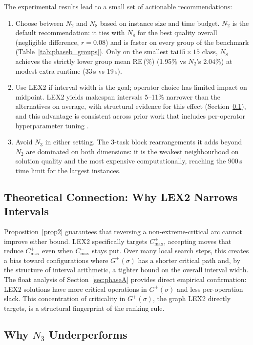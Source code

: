 \documentclass[preprint,12pt]{elsarticle}
\begin{document}
The experimental results lead to a small set of actionable recommendations:
\begin{enumerate}
\item Choose between $N_2$ and $N_8$ based on instance size and time budget. $N_2$ is the default recommendation: it ties with $N_8$ for the best quality overall (negligible difference, $r = 0.08$) and is faster on every group of the benchmark (Table~\ref{tab:phaseb_groups}). Only on the smallest tai$15{\times}15$ class, $N_8$ achieves the strictly lower group mean RE\,(\%) (1.95\% vs $N_2$'s 2.04\%) at modest extra runtime (33\,s vs 19\,s).
\item Use LEX2 if interval width is the goal; operator choice has limited impact on midpoint. LEX2 yields makespan intervals 5--11\% narrower than the alternatives on average, with structural evidence for this effect (Section~\ref{sec:lex2-width}), and this advantage is consistent across prior work that includes per-operator hyperparameter tuning \cite{DiazICAE2023,DiazIGPL2022}.
\item Avoid $N_3$ in either setting. The 3-task block rearrangements it adds beyond $N_2$ are dominated on both dimensions: it is the weakest neighbourhood on solution quality and the most expensive computationally, reaching the 900\,s time limit for the largest instances.
\end{enumerate}

\subsection{Theoretical Connection: Why LEX2 Narrows Intervals}
\label{sec:lex2-width}

Proposition~\ref{prop2} guarantees that reversing a non-extreme-critical arc cannot improve either bound. LEX2 specifically targets $C^+_{\max}$, accepting moves that reduce $C^+_{\max}$ even when $C^-_{\max}$ stays put. Over many local search steps, this creates a bias toward configurations where $G^+(\sigma)$ has a shorter critical path and, by the structure of interval arithmetic, a tighter bound on the overall interval width. The float analysis of Section~\ref{sec:phaseA} provides direct empirical confirmation: LEX2 solutions have more critical operations in $G^+(\sigma)$ and less per-operation slack. This concentration of criticality in $G^+(\sigma)$, the graph LEX2 directly targets, is a structural fingerprint of the ranking rule.

\subsection{Why $N_3$ Underperforms}
\label{sec:N3-underperforms}
\end{document}

